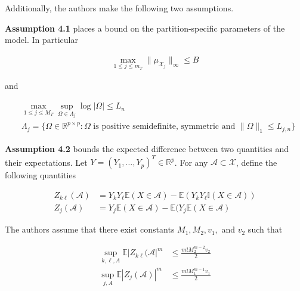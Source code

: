 \documentclass[12pt]{article}
\begin{document}
Additionally, the authors make the following two
assumptions.

\textbf{Assumption 4.1} places a bound on the
partition-specific parameters of the model. In particular

\begin{align}
  \max_{1\le j\le m_T} \|\mu_{\mathcal{X}_j}\|_\infty \le B
\end{align}

and

\begin{align}
  &\max_{1 \le j \le M_T} \sup_{\Omega \in \Lambda_j} \log |\Omega| \le L_n \\
  &\Lambda_j = \{\Omega \in \mathbb{R}^{p \times p} :
  \Omega \text{ is positive semidefinite, symmetric and } \|\Omega\|_1 \le L_{j,n}
  \}
\end{align}

\textbf{Assumption 4.2} bounds the expected difference between two
quantities and their expectations. Let $Y = (Y_1, \ldots, Y_p)^T \in
\mathbb{R}^p$. For any $\mathcal{A} \subset \mathcal{X}$, define the
following quantities

\begin{align}
  Z_{k\ell}(\mathcal{A}) &=
  Y_k Y_\ell \mathbb{E}(X \in \mathcal{A}) - \mathbb{E}(Y_k Y_\ell \mathbb{I}(X \in \mathcal{A})) \\
  Z_{j}(\mathcal{A}) &=
  Y_j \mathbb{E}(X \in \mathcal{A}) - \mathbb{E}(Y_j \mathbb{E}(X \in \mathcal{A})
\end{align}

The authors assume that there exist constants $M_1, M_2, v_1,$ and
$v_2$ such that

\begin{align}
  \sup_{k,\ell, A} \mathbb{E} | Z_{k\ell}(\mathcal{A}|^m &\le \frac{m! M_2^{m-2} v_2}{2} \\
  \sup_{j, A} \mathbb{E} | Z_j(\mathcal{A}) |^m &\le \frac{m! M_1^{m-1} v_1}{2}
\end{align}






\end{document}
